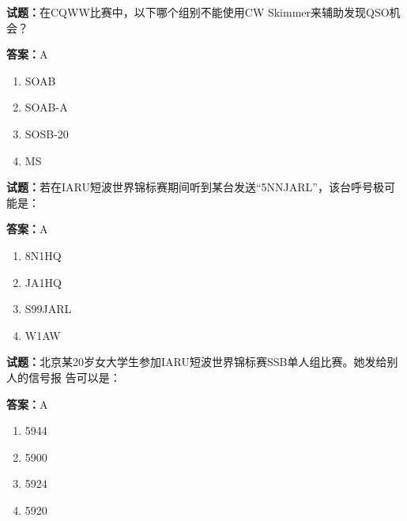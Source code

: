 \documentclass{ctexbook}
\begin{document}
\textbf{试题：}在CQWW比赛中，以下哪个组别不能使用CW Skimmer来辅助发现QSO机会？ 

\textbf{答案：}A 

\begin{enumerate}[leftmargin=3em]
  \item SOAB 

  \item SOAB-A 

  \item SOSB-20 

  \item MS 

\end{enumerate}






\vspace{1em}

\textbf{试题：}若在IARU短波世界锦标赛期间听到某台发送“5NNJARL”，该台呼号极可能是： 

\textbf{答案：}A 

\begin{enumerate}[leftmargin=3em]
  \item 8N1HQ 

  \item JA1HQ 

  \item S99JARL 

  \item W1AW 

\end{enumerate}





\vspace{1em}

\textbf{试题：}北京某20岁女大学生参加IARU短波世界锦标赛SSB单人组比赛。她发给别人的信号报
告可以是： 

\textbf{答案：}A 

\begin{enumerate}[leftmargin=3em]
  \item 5944 

  \item 5900 

  \item 5924 

  \item 5920 

\end{enumerate}
\end{document}
